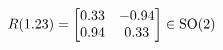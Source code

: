 \documentclass[preview]{standalone}
\begin{document}
\begin{align*}
\special{dvisvgm:raw <g id='unique000'>}R(1.23) = \begin{bmatrix} 0.33 & -0.94 \\ 0.94 & 0.33 \end{bmatrix} \in \text{SO}(2)\special{dvisvgm:raw </g>}
\end{align*}
\end{document}
